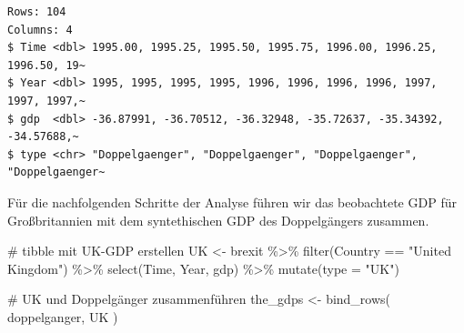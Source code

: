 \documentclass[
  a4paper,
  DIV=11,
  oneside]{scrreprt}
\newenvironment{Shaded}{\begin{snugshade}}{\end{snugshade}}
\newcommand{\AttributeTok}[1]{\textcolor[rgb]{0.40,0.45,0.13}{#1}}
\newcommand{\CommentTok}[1]{\textcolor[rgb]{0.37,0.37,0.37}{#1}}
\newcommand{\FunctionTok}[1]{\textcolor[rgb]{0.28,0.35,0.67}{#1}}
\newcommand{\NormalTok}[1]{\textcolor[rgb]{0.00,0.23,0.31}{#1}}
\newcommand{\OtherTok}[1]{\textcolor[rgb]{0.00,0.23,0.31}{#1}}
\newcommand{\SpecialCharTok}[1]{\textcolor[rgb]{0.37,0.37,0.37}{#1}}
\newcommand{\StringTok}[1]{\textcolor[rgb]{0.13,0.47,0.30}{#1}}
\begin{document}
\begin{Shaded}
\end{Shaded}

\begin{verbatim}
Rows: 104
Columns: 4
$ Time <dbl> 1995.00, 1995.25, 1995.50, 1995.75, 1996.00, 1996.25, 1996.50, 19~
$ Year <dbl> 1995, 1995, 1995, 1995, 1996, 1996, 1996, 1996, 1997, 1997, 1997,~
$ gdp  <dbl> -36.87991, -36.70512, -36.32948, -35.72637, -35.34392, -34.57688,~
$ type <chr> "Doppelgaenger", "Doppelgaenger", "Doppelgaenger", "Doppelgaenger~
\end{verbatim}

Für die nachfolgenden Schritte der Analyse führen wir das beobachtete
GDP für Großbritannien mit dem syntethischen GDP des Doppelgängers
zusammen.

\begin{Shaded}
\begin{Highlighting}[]
\CommentTok{\# tibble mit UK{-}GDP erstellen}
\NormalTok{UK }\OtherTok{\textless{}{-}}\NormalTok{ brexit }\SpecialCharTok{\%\textgreater{}\%} 
  \FunctionTok{filter}\NormalTok{(Country }\SpecialCharTok{==} \StringTok{"United Kingdom"}\NormalTok{) }\SpecialCharTok{\%\textgreater{}\%} 
  \FunctionTok{select}\NormalTok{(Time, Year, gdp) }\SpecialCharTok{\%\textgreater{}\%}
  \FunctionTok{mutate}\NormalTok{(}\AttributeTok{type =} \StringTok{"UK"}\NormalTok{)}

\CommentTok{\# UK und Doppelgänger zusammenführen}
\NormalTok{the\_gdps }\OtherTok{\textless{}{-}} \FunctionTok{bind\_rows}\NormalTok{(}
\NormalTok{  doppelganger, UK}
\NormalTok{)}
\end{Highlighting}
\end{Shaded}
\end{document}
